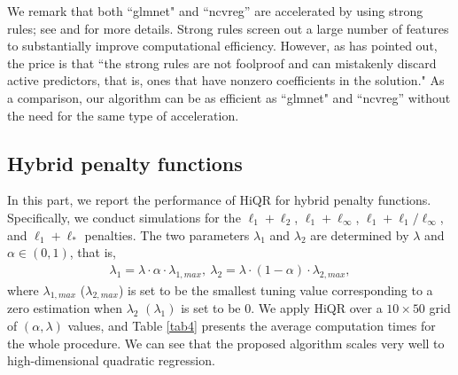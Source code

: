 \documentclass[preprint,authoryear,11pt]{elsarticle}
\begin{document}
\begin{table}[!htbp] \centering  
	\caption{Average computation time (standard deviation) of three packages for obtaining a solution path for all-paris LASSO over 10 replications. The same set of 50 $\lambda$s has been used for the three different packages, and time is recorded in seconds.} 
	  \label{tab3} 
\end{table} 
 
We remark that both ``glmnet" and ``ncvreg'' are  accelerated by using strong rules; see \cite{tibshirani2012strong} and \cite{lee2015strong} for more details. Strong rules screen out a large number of features to substantially improve computational efficiency. However, as \cite{tibshirani2012strong} has pointed out, the price is that ``the strong rules are not foolproof and can mistakenly discard active predictors, that is, ones that have nonzero coefficients in the solution."   As a comparison, our algorithm can be as efficient as ``glmnet" and ``ncvreg'' without the need for the same type of acceleration.  

\subsection{Hybrid penalty functions}
In this part, we report the performance of HiQR for hybrid penalty functions. Specifically, we conduct simulations for the $\ell_1+\ell_2$, $\ell_1+\ell_\infty$, $\ell_1+\ell_1/\ell_\infty$, and $\ell_1+\ell_*$ penalties. The two parameters $\lambda_1$ and $\lambda_2$ are determined by $\lambda$ and $\alpha \in(0,1)$, that is,
\begin{align*}
	\lambda_1=\lambda\cdot\alpha\cdot\lambda_{1,max},~\lambda_2=\lambda\cdot(1-\alpha)\cdot\lambda_{2,max},
\end{align*}  
where $\lambda_{1,max}$ ($\lambda_{2,max}$) is set to be the smallest tuning value corresponding to a zero estimation when $\lambda_2$ $(\lambda_1)$ is set to be 0. We apply HiQR over a $10 \times 50$ grid of $(\alpha,\lambda)$ values, and Table \ref{tab4} presents the average computation times for the whole procedure. We can see that the proposed algorithm scales very well to high-dimensional quadratic regression.
\end{document}
